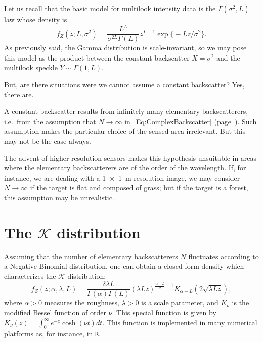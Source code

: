 \documentclass{beamer}
\begin{document}
\begin{frame}[allowframebreaks]
Let us recall that the basic model for multilook intensity data is the $\Gamma(\sigma^2,L)$ law whose density is
\begin{equation}
f_Z(z;L,\sigma^2) = \frac{L^L}{\sigma^{2L}\Gamma(L)} z^{L-1} 
	\exp\big\{ -L z / \sigma^2
	\big\}.
\end{equation}
As previously said, the Gamma distribution is scale-invariant, so we may pose this model as the product between the constant backscatter $X=\sigma^2$ and the multilook speckle $Y\sim\Gamma(1,L)$.
\end{frame}


\begin{frame}[allowframebreaks]
But, are there situations were we cannot assume a constant backscatter?
Yes, there are.

A constant backscatter results from infinitely many elementary backscatterers, i.e.\ from the assumption that $N\to\infty$ in~\eqref{Eq:ComplexBackscatter} (page~\pageref{Eq:ComplexBackscatter}).
Such assumption makes the particular choice of the sensed area irrelevant.
But this may not be the case always.

The advent of higher resolution sensors makes this hypothesis unsuitable in areas where the elementary backscatterers are of the order of the wavelength.
If, for instance, we are dealing with a \SI{1x1}{\meter} resolution image, we may consider $N\to\infty$ if the target is flat and composed of grass;
but if the target is a forest, this assumption may be unrealistic.

\end{frame}

\section{The $\mathcal K$ distribution}

\begin{frame}[allowframebreaks]

Assuming that the number of elementary backscatterers $N$ fluctuates according to a Negative Binomial distribution, one can obtain a closed-form density which characterizes the $\mathcal K$ distribution:
\begin{equation}
f_Z(z;\alpha,\lambda,L) =
\frac{2\lambda L}{\Gamma(\alpha)\Gamma(L)} (\lambda L z)^{\frac{\alpha+L}{2}-1} K_{\alpha-L}(2\sqrt{\lambda L z}),
\label{Eq:DensKI}
\end{equation}
where $\alpha>0$ measures the roughness, $\lambda>0$ is a scale parameter, and $K_\nu$ is the modified Bessel function of order $\nu$.
This special function is given by $K_\nu (z) = \int_0^\infty e^{-z} \cosh (\nu t) dt$.
This function is implemented in many numerical platforms as, for instance, in \texttt R.
\end{frame}
\end{document}

